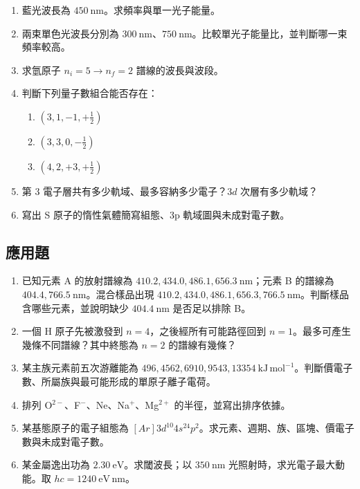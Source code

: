 \documentclass[11pt,a4paper]{article}
\providecommand{\tightlist}{%
  \setlength{\itemsep}{0pt}\setlength{\parskip}{0pt}}
\begin{document}
\begin{enumerate}
\def\labelenumi{\arabic{enumi}.}
\tightlist
\item
  藍光波長為 \(450\ \mathrm{nm}\)。求頻率與單一光子能量。
\item
  兩束單色光波長分別為 \(300\ \mathrm{nm}\)、\(750\ \mathrm{nm}\)。比較單光子能量比，並判斷哪一束頻率較高。
\item
  求氫原子 \(n_i=5\to n_f=2\) 譜線的波長與波段。
\item
  判斷下列量子數組合能否存在：

  \begin{enumerate}
  \def\labelenumii{\arabic{enumii}.}
  \tightlist
  \item
    \((3,1,-1,+\frac12)\)
  \item
    \((3,3,0,-\frac12)\)
  \item
    \((4,2,+3,+\frac12)\)
  \end{enumerate}
\item
  第 3 電子層共有多少軌域、最多容納多少電子？\(3d\) 次層有多少軌域？
\item
  寫出 S 原子的惰性氣體簡寫組態、3p 軌域圖與未成對電子數。
\end{enumerate}

\subsection{應用題}\label{ux61c9ux7528ux984c}

\begin{enumerate}
\def\labelenumi{\arabic{enumi}.}
\setcounter{enumi}{6}
\tightlist
\item
  已知元素 A 的放射譜線為 \(410.2,434.0,486.1,656.3\ \mathrm{nm}\)；元素 B 的譜線為 \(404.4,766.5\ \mathrm{nm}\)。混合樣品出現 \(410.2,434.0,486.1,656.3,766.5\ \mathrm{nm}\)。判斷樣品含哪些元素，並說明缺少 \(404.4\ \mathrm{nm}\) 是否足以排除 B。
\item
  一個 H 原子先被激發到 \(n=4\)，之後經所有可能路徑回到 \(n=1\)。最多可產生幾條不同譜線？其中終態為 \(n=2\) 的譜線有幾條？
\item
  某主族元素前五次游離能為 \(496,4562,6910,9543,13354\ \mathrm{kJ\,mol^{-1}}\)。判斷價電子數、所屬族與最可能形成的單原子離子電荷。
\item
  排列 O\(^{2-}\)、F\(^-\)、Ne、Na\(^+\)、Mg\(^{2+}\) 的半徑，並寫出排序依據。
\item
  某基態原子的電子組態為 \([Ar]3d^{10}4s^24p^2\)。求元素、週期、族、區塊、價電子數與未成對電子數。
\item
  某金屬逸出功為 \(2.30\ \mathrm{eV}\)。求閾波長；以 \(350\ \mathrm{nm}\) 光照射時，求光電子最大動能。取 \(hc=1240\ \mathrm{eV\,nm}\)。
\end{enumerate}
\end{document}
